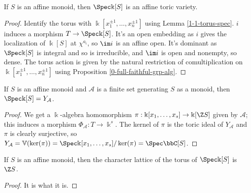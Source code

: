 \begin{proposition}
  \label{1-1-14-aff-tor-var-spec-aff-mon-alg}
  \leanok

  If $S$ is an affine monoid, then $\Spec \Bbbk[S]$ is an affine toric variety.
\end{proposition}
\begin{proof}

  Identify the torus with $\Bbbk[x_1^{\pm1}, \dotsc, x_n^{\pm1}]$ using Lemma \ref{1-1-torus-spec}.
  $i$ induces a morphism $T \to \Spec \Bbbk[S]$. It's an open embedding as $i$ gives the localization of $\Bbbk[S]$ at $\chi^{a_i}$, so $\im i$ is an affine open. It's dominant as $\Spec \Bbbk[S]$ is integral and so is irreducible, and $\im i$ is open and nonempty, so dense. The torus action is given by the natural restriction of comultiplication on $\Bbbk[x_1^{\pm1}, \dotsc, x_n^{\pm1}]$ using Proposition \ref{0-full-faithful-grp-alg}.
\end{proof}


\begin{proposition}
  \label{1-1-14-spec-aff-mon-alg-eq-ya}

  If $S$ is an affine monoid and $\mathcal A$ is a finite set generating $S$ as a monoid, then $\Spec \Bbbk[S] = Y_{\mathcal A}$.
\end{proposition}
\begin{proof}

  We get a $\Bbbk$-algebra homomorphism $\pi : \Bbbk[x_1, \dotsc, x_s] \to \Bbbk[\Z S]$ given by $\mathcal A$; this induces a morphism $\Phi_{\mathcal A} : T \to \Bbbk^s$. The kernel of $\pi$ is the toric ideal of $Y_{\mathcal A}$ and $\pi$ is clearly surjective, so $Y_{\mathcal A} = \mathbb V(\ker(\pi)) = \Spec \Bbbk[x_1, \dotsc, x_s] / \ker(\pi) = \Spec \bbC[S]$.
\end{proof}


\begin{proposition}
  \label{1-1-14-char-spec-aff-mon-alg}

  If $S$ is an affine monoid, then the character lattice of the torus of $\Spec \Bbbk[S]$ is $\Z S$.
\end{proposition}
\begin{proof}

  It is what it is.
\end{proof}


